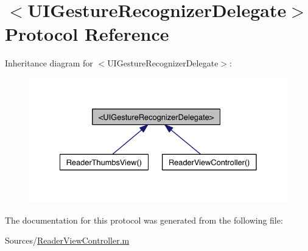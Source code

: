 \hypertarget{class_u_i_gesture_recognizer_delegate-p}{\section{$<$U\-I\-Gesture\-Recognizer\-Delegate$>$ Protocol Reference}
\label{dc/d81/class_u_i_gesture_recognizer_delegate-p}
}


Inheritance diagram for $<$U\-I\-Gesture\-Recognizer\-Delegate$>$\-:
\nopagebreak
\begin{figure}[H]
\begin{center}
\leavevmode
\includegraphics[width=331pt]{da/dba/class_u_i_gesture_recognizer_delegate-p__inherit__graph}
\end{center}
\end{figure}


The documentation for this protocol was generated from the following file\-:\begin{DoxyCompactItemize}
\item 
Sources/\hyperlink{_reader_view_controller_8m}{Reader\-View\-Controller.\-m}\end{DoxyCompactItemize}
